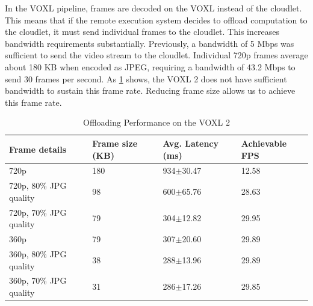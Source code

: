 In the VOXL pipeline, frames are decoded on the VOXL instead of the cloudlet.
This means that if the remote execution system decides to offload computation
to the cloudlet, it must send individual frames to the cloudlet. This increases
bandwidth requirements substantially. Previously, a bandwidth of 5 Mbps was
sufficient to send the video stream to the cloudlet. Individual 720p frames
average about 180 KB when encoded as JPEG, requiring a bandwidth of 43.2 Mbps to send 30 frames per second.
As \cref{tab:voxl2-offload-performance} shows, the VOXL 2 does not have sufficient bandwidth to sustain this frame rate. Reducing frame size allows us to achieve this frame rate.

\begin{table}[htbp]
    \centering
    \begin{tabular}{llll}
        \toprule
        \textbf{Frame details} & \textbf{Frame size (KB)} & \textbf{Avg. Latency (ms)} & \textbf{Achievable FPS}\\
        \midrule
        720p & 180 & 934$\pm$\small{30.47} & 12.58\\
        720p, 80\% JPG quality  & 98 & 600$\pm$\small{65.76} &28.63\\
        720p, 70\% JPG quality & 79 & 304$\pm$\small{12.82} & 29.95\\
        360p & 79 & 307$\pm$\small{20.60}  &29.89 \\
        360p, 80\% JPG quality & 38 &288$\pm$\small{13.96} & 29.89\\
        360p, 70\% JPG quality & 31 & 286$\pm$\small{17.26} & 29.85\\
        \bottomrule
\end{tabular}
\caption{Offloading Performance on the VOXL 2}
\label{tab:voxl2-offload-performance}
\end{table}
